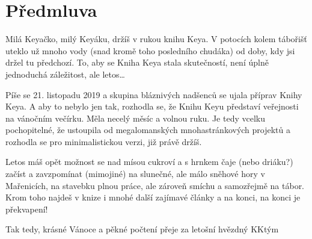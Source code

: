 
\chapter{Předmluva} %
\label{cha:předmluva}

Milá Keyačko, milý Keyáku,
držíš v rukou knihu Keya. V potocích kolem tábořišť uteklo už mnoho vody (snad kromě toho posledního chudáka) od doby, kdy jsi držel tu předchozí. To, aby se Kniha Keya stala skutečností, není úplně jednoduchá záležitost, ale letos…

Píše se 21. listopadu 2019 a skupina bláznivých nadšenců se ujala příprav Knihy Keya. A aby to nebylo jen tak, rozhodla se, že Knihu Keyu představí veřejnosti na vánočním večírku. Měla necelý měsíc a volnou ruku. Je tedy vcelku pochopitelné, že ustoupila od megalomanských mnohastránkových projektů a rozhodla se pro minimalistickou verzi, již právě držíš.

Letos máš opět možnost se nad mísou cukroví a s hrnkem čaje (nebo driáku?) začíst a zavzpomínat (mimojiné) na slunečné, ale málo sněhové hory v Mařenicích, na stavebku plnou práce, ale zároveň smíchu a samozřejmě na tábor. Krom toho najdeš v knize i mnohé další zajímavé články a na konci, na konci je překvapení!

Tak tedy, krásné Vánoce a pěkné počtení
přeje za letošní hvězdný KKtým

\restoregeometry

\clearpage